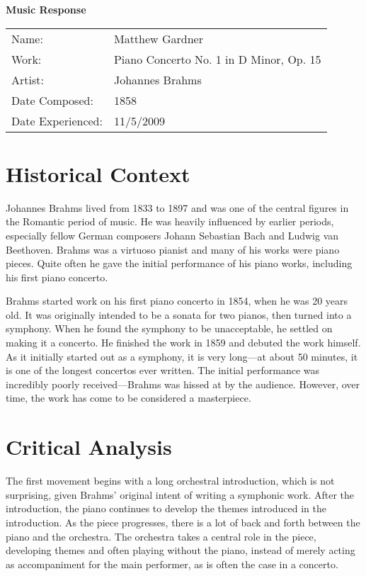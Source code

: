\documentclass[onecolumn, 12pt]{article}
\title{}
\author{Matthew Gardner}
\date{}
\begin{document}
\textbf{Music Response}

\begin{tabular}{ll}
  Name:&Matthew Gardner \\
  Work:&Piano Concerto No. 1 in D Minor, Op. 15 \\
  Artist:&Johannes Brahms \\
  Date Composed:&1858 \\
  Date Experienced:&11/5/2009 \\
\end{tabular}

\section*{Historical Context}

Johannes Brahms lived from 1833 to 1897 and was one of the central figures in
the Romantic period of music.  He was heavily influenced by earlier periods,
especially fellow German composers Johann Sebastian Bach and Ludwig van
Beethoven.  Brahms was a virtuoso pianist and many of his works were piano
pieces.  Quite often he gave the initial performance of his piano works, 
including his first piano concerto.

Brahms started work on his first piano concerto in 1854, when he was 20 years
old.  It was originally intended to be a sonata for two pianos, then turned
into a symphony.  When he found the symphony to be unacceptable, he settled on
making it a concerto.  He finished the work in 1859 and debuted the work
himself.  As it initially started out as a symphony, it is very long---at about
50 minutes, it is one of the longest concertos ever written.  The initial
performance was incredibly poorly received---Brahms was hissed at by the
audience.  However, over time, the work has come to be considered a
masterpiece.

\section*{Critical Analysis}

The first movement begins with a long orchestral introduction, which is not
surprising, given Brahms' original intent of writing a symphonic work.  After
the introduction, the piano continues to develop the themes introduced in the
introduction.  As the piece progresses, there is a lot of back and forth
between the piano and the orchestra.  The orchestra takes a central role in the
piece, developing themes and often playing without the piano, instead of merely
acting as accompaniment for the main performer, as is often the case in a
concerto.
\end{document}
